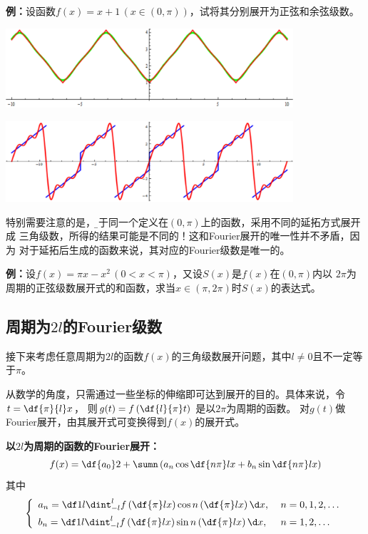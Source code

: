 {\bf 例：}设函数$f(x)=x+1\,(x\in(0,\pi))$，试将其分别展开为正弦和余弦级数。

\begin{center}
	\includegraphics[width=0.8\textwidth]{./images/ch13/cs.pdf} 
	
	\includegraphics[width=0.8\textwidth]{./images/ch13/ss.pdf}
\end{center}

特别需要注意的是，{\b 对于同一个定义在$(0,\pi)$上的函数，采用不同的延拓方式展开成
三角级数，所得的结果可能是不同的！这和Fourier展开的唯一性并不矛盾，因为
对于延拓后生成的函数来说，其对应的Fourier级数是唯一的。}

{\bf 例：}设$f(x)=\pi x-x^2\,(0<x<\pi)$，又设$S(x)$是$f(x)$在$(0,\pi)$内以
$2\pi$为周期的正弦级数展开式的和函数，求当$x\in(\pi,2\pi)$时$S(x)$的表达式。

\subsection{周期为$2l$的Fourier级数}

接下来考虑任意周期为$2l$的函数$f(x)$的三角级数展开问题，其中$l\ne0$且不一定等于$\pi$。

从数学的角度，只需通过一些坐标的伸缩即可达到展开的目的。具体来说，令$t=\df{\pi}{l}x$，
则$g(t)=f\left(\df{l}{\pi}t\right)$ 是以$2\pi$为周期的函数。 
对$g(t)$做Fourier展开，由其展开式可变换得到$f(x)$的展开式。

\begin{thx}
	{\bf 以$2l$为周期的函数的Fourier展开：}
	$$f(x)=\df{a_0}2+\sumn\left(a_n\cos\df{n\pi}lx+b_n\sin\df{n\pi}lx\right)$$
	其中
	$$\left\{\begin{array}{ll}
	a_n=\df1{l}\dint_{-l}^{l}f\left(\df{\pi}lx\right)
	\cos n\left(\df{\pi}lx\right)\d x,\;&
	n=0,1,2,\ldots\\[5pt] b_n=\df1{l}\dint_{-l}^{l}f\left(\df{\pi}lx\right)
	\sin n\left(\df{\pi}lx\right)\d x,\;& n=1,2,\ldots
	\end{array}\right.$$
\end{thx}

